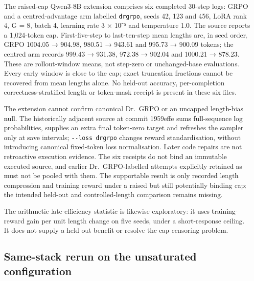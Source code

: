\documentclass[12pt,a4paper]{report}
\DeclareRobustCommand{\longtok}[1]{\texttt{\seqsplit{#1}}}
\begin{document}
The raised-cap Qwen3-8B extension comprises six completed 30-step logs:
GRPO and a centred-advantage arm labelled \texttt{drgrpo}, seeds 42, 123
and 456, LoRA rank 4, G = 8, batch 4, learning rate 3 × 10⁻⁵ and
temperature 1.0. The source reports a 1,024-token cap. First-five-step
to last-ten-step mean lengths are, in seed order, GRPO 1004.05 → 904.98,
980.51 → 943.61 and 995.73 → 900.09 tokens; the centred arm records
999.43 → 931.38, 972.38 → 902.04 and 1000.21 → 878.23. These are
rollout-window means, not step-zero or unchanged-base evaluations. Every
early window is close to the cap; exact truncation fractions cannot be
recovered from mean lengths alone. No held-out accuracy, per-completion
correctness-stratified length or token-mask receipt is present in these
six files.

The extension cannot confirm canonical Dr.~GRPO or an uncapped
length-bias null. The historically adjacent \longtok{live\_\allowbreak{}zvf\_\allowbreak{}probe.py}
source at commit 1959effe sums full-sequence log probabilities, supplies
an extra final token-zero target and refreshes the sampler only at save
intervals; \texttt{-\/-loss\ drgrpo} changes reward standardisation,
without introducing canonical fixed-token loss normalisation. Later code
repairs are not retroactive execution evidence. The six receipts do not
bind an immutable executed source, and earlier Dr.~GRPO-labelled
attempts explicitly retained as \longtok{invalid\_\allowbreak{}actually\_\allowbreak{}grpo} must
not be pooled with them. The supportable result is only recorded length
compression and training reward under a raised but still potentially
binding cap; the intended held-out and controlled-length comparison
remains missing.

The arithmetic late-efficiency statistic is likewise exploratory: it
uses training-reward gain per unit length change on five seeds, under a
short-response ceiling. It does not supply a held-out benefit or resolve
the cap-censoring problem.

\subsection{Same-stack rerun on the unsaturated
configuration}\label{same-stack-rerun-on-the-unsaturated-configuration}
\end{document}

